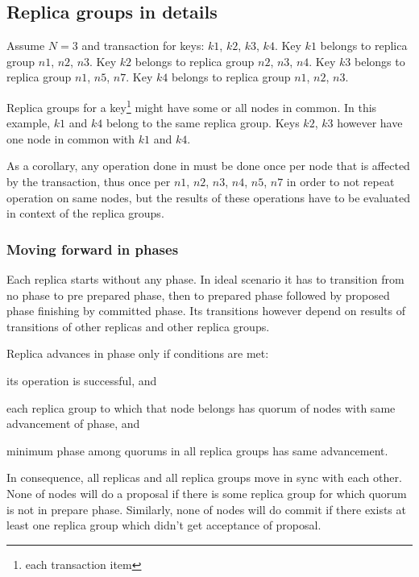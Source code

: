 \subsection{Replica groups in details}
\label{sec:mpp:replicaGroups}
Assume $N=3$ and transaction for keys: $k1$, $k2$, $k3$, $k4$.
Key $k1$ belongs to replica group $n1$, $n2$, $n3$.
Key $k2$ belongs to replica group $n2$, $n3$, $n4$.
Key $k3$ belongs to replica group $n1$, $n5$, $n7$.
Key $k4$ belongs to replica group $n1$, $n2$, $n3$.


Replica groups for a key\footnote{each transaction item} might have some or all nodes in common.
In this example, $k1$ and $k4$ belong to the same replica group. Keys $k2$, $k3$ however have one node in common with $k1$ and $k4$.

As a corollary, any operation done in \mpp must be done once per node that is affected by the transaction, thus once per $n1$, $n2$, $n3$, $n4$, $n5$, $n7$ in order to not repeat operation on same nodes, but the results of these operations have to be evaluated in context of the replica groups. 


\subsubsection{Moving forward in phases}
Each replica starts without any phase. In ideal scenario it has to transition from no phase to pre prepared phase, then to prepared phase followed by proposed phase finishing by committed phase. Its transitions however depend on results of transitions of other replicas and other replica groups.


Replica advances in phase only if conditions are met: \begin{enumerate*}
\item its operation is successful, and
\item each replica group to which that node belongs has quorum of nodes with same advancement of phase, and
\item minimum phase among quorums in all replica groups has same advancement.
\end{enumerate*}


In consequence, all replicas and all replica groups move in sync with each other. None of nodes will do a proposal if there is some replica group for which quorum is not in prepare phase. Similarly, none of nodes will do commit if there exists at least one replica group which didn’t get acceptance of proposal.


